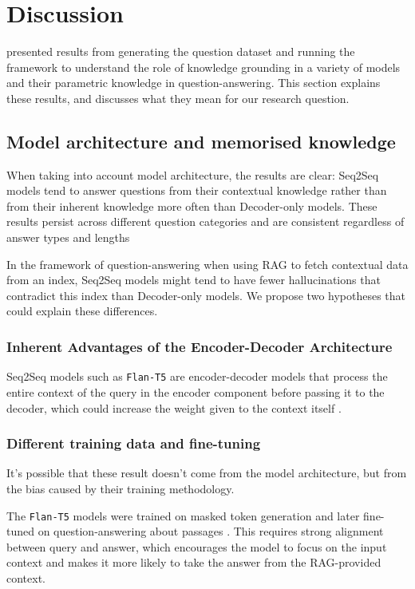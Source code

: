 \section{Discussion}
\label{discussion}

 presented results from generating the question dataset and running the framework to understand the role of knowledge grounding in a variety of models and their parametric knowledge in question-answering.
This section explains these results, and discusses what they mean for our research question.

\subsection{Model architecture and memorised knowledge}
\label{model_architecture_parametric}

When taking into account model architecture, the results are clear: Seq2Seq models tend to answer questions from their contextual knowledge rather than from their inherent knowledge more often than Decoder-only models.
These results persist across different question categories and are consistent regardless of answer types and lengths

In the framework of question-answering when using RAG to fetch contextual data from an index, Seq2Seq models might tend to have fewer hallucinations that contradict this index than Decoder-only models.
We propose two hypotheses that could explain these differences.

\subsubsection{Inherent Advantages of the Encoder-Decoder Architecture}

Seq2Seq models such as \texttt{Flan-T5} are encoder-decoder models that process the entire context of the query in the encoder component before passing it to the decoder, which could increase the weight given to the context itself \cite{flant5}.

\subsubsection{Different training data and fine-tuning}

It's possible that these result doesn't come from the model architecture, but from the bias caused by their training methodology.

The \texttt{Flan-T5} models were trained on masked token generation and later fine-tuned on question-answering about passages \cite{flant5}.
This requires strong alignment between query and answer, which encourages the model to focus on the input context and makes it more likely to take the answer from the RAG-provided context.

